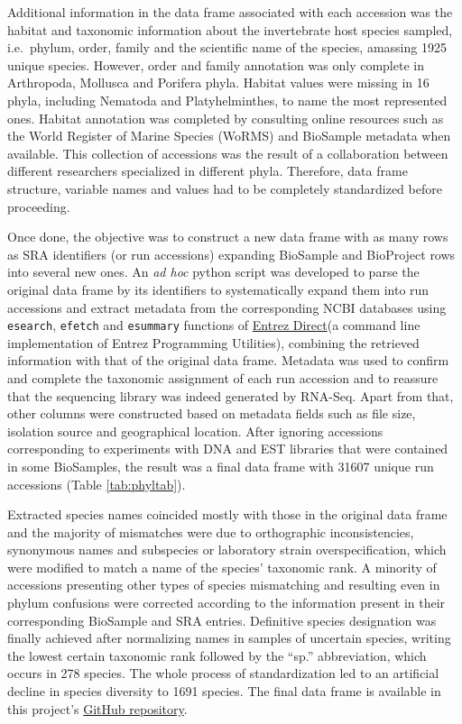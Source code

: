 \documentclass[
  openany]{book}
\begin{document}
Additional information in the data frame associated with each accession was the habitat and taxonomic information about the invertebrate host species sampled, i.e.~phylum, order, family and the scientific name of the species, amassing 1925 unique species. However, order and family annotation was only complete in Arthropoda, Mollusca and Porifera phyla. Habitat values were missing in 16 phyla, including Nematoda and Platyhelminthes, to name the most represented ones. Habitat annotation was completed by consulting online resources such as the World Register of Marine Species (WoRMS) \autocite{worms} and BioSample metadata when available. This collection of accessions was the result of a collaboration between different researchers specialized in different phyla. Therefore, data frame structure, variable names and values had to be completely standardized before proceeding.

Once done, the objective was to construct a new data frame with as many rows as SRA identifiers (or run accessions) expanding BioSample and BioProject rows into several new ones. An \emph{ad hoc} python script was developed to parse the original data frame by its identifiers to systematically expand them into run accessions and extract metadata from the corresponding NCBI databases using \texttt{esearch}, \texttt{efetch} and \texttt{esummary} functions of \href{https://www.ncbi.nlm.nih.gov/books/NBK179288/}{Entrez Direct}(a command line implementation of Entrez Programming Utilities), combining the retrieved information with that of the original data frame. Metadata was used to confirm and complete the taxonomic assignment of each run accession and to reassure that the sequencing library was indeed generated by RNA-Seq. Apart from that, other columns were constructed based on metadata fields such as file size, isolation source and geographical location. After ignoring accessions corresponding to experiments with DNA and EST libraries that were contained in some BioSamples, the result was a final data frame with 31607 unique run accessions (Table \ref{tab:phyltab}).

Extracted species names coincided mostly with those in the original data frame and the majority of mismatches were due to orthographic inconsistencies, synonymous names and subspecies or laboratory strain overspecification, which were modified to match a name of the species' taxonomic rank. A minority of accessions presenting other types of species mismatching and resulting even in phylum confusions were corrected according to the information present in their corresponding BioSample and SRA entries. Definitive species designation was finally achieved after normalizing names in samples of uncertain species, writing the lowest certain taxonomic rank followed by the ``sp.'' abbreviation, which occurs in 278 species. The whole process of standardization led to an artificial decline in species diversity to 1691 species. The final data frame is available in this project's \href{https://github.com/palf98/metaviromics}{GitHub repository}.
\end{document}
